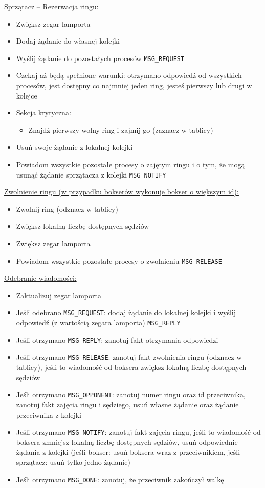 \documentclass{article}
\begin{document}
\underline{Sprzątacz -- Rezerwacja ringu:}
\begin{itemize}
    \item Zwiększ zegar lamporta
    \item Dodaj żądanie do własnej kolejki
    \item Wyślij żądanie do pozostałych procesów \verb|MSG_REQUEST|
    \item Czekaj aż będą spełnione warunki: otrzymano odpowiedź od
    wszystkich procesów, jest dostępny co najmniej jeden ring, jesteś
    pierwszy lub drugi w kolejce
    \item Sekcja krytyczna:
    \begin{itemize}
        \item Znajdź pierwszy wolny ring i zajmij go (zaznacz w tablicy)
    \end{itemize}
    \item Usuń swoje żądanie z lokalnej kolejki
    \item Powiadom wszystkie pozostałe procesy o zajętym ringu i o tym,
    że mogą usunąć żądanie sprzątacza z kolejki \verb|MSG_NOTIFY|
\end{itemize}

\underline{Zwolnienie ringu (w przypadku bokserów wykonuje bokser o większym id):}
\begin{itemize}
    \item Zwolnij ring (odznacz w tablicy)
    \item Zwiększ lokalną liczbę dostępnych sędziów
    \item Zwiększ zegar lamporta
    \item Powiadom wszystkie pozostałe procesy o zwolnieniu \verb|MSG_RELEASE|
\end{itemize}

\underline{Odebranie wiadomości:}
\begin{itemize}
    \item Zaktualizuj zegar lamporta
    \item Jeśli odebrano \verb|MSG_REQUEST|: dodaj żądanie do lokalnej
    kolejki i  wyślij odpowiedź (z wartością zegara lamporta) \verb|MSG_REPLY|
    \item Jeśli otrzymano \verb|MSG_REPLY|: zanotuj fakt otrzymania
    odpowiedzi
    \item Jeśli otrzymano \verb|MSG_RELEASE|: zanotuj fakt zwolnienia
    ringu (odznacz w tablicy), jeśli to wiadomość od boksera zwiększ
    lokalną liczbę dostępnych sędziów
    \item Jeśli otrzymano \verb|MSG_OPPONENT|: zanotuj numer ringu oraz
    id przeciwnika, zanotuj fakt zajęcia ringu i sędziego, usuń własne
    żądanie oraz żądanie przeciwnika z kolejki
    \item Jeśli otrzymano \verb|MSG_NOTIFY|: zanotuj fakt zajęcia ringu,
    jeśli to wiadomość od boksera zmniejsz lokalną liczbę dostępnych
    sędziów, usuń odpowiednie żądania z kolejki (jeśli bokser: usuń
    boksera wraz z przeciwnikiem, jeśli sprzątacz: usuń tylko jedno
    żądanie)
    \item Jeśli otrzymano \verb|MSG_DONE|: zanotuj, że przeciwnik
    zakończył walkę
\end{itemize}
\end{document}
